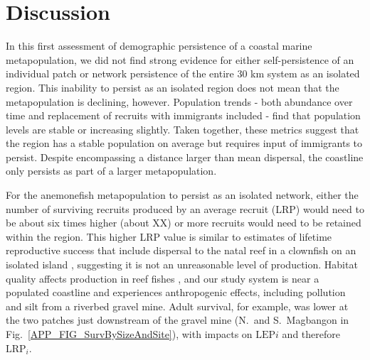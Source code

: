 \documentclass[12pt, oneside]{article}   	%
\begin{document}
\section*{Discussion}

In this first assessment of demographic persistence of a coastal marine metapopulation, we did not find strong evidence for either self-persistence of an individual patch or network persistence of the entire 30 km system as an isolated region. This inability to persist as an isolated region does not mean that the metapopulation is declining, however. Population trends - both abundance over time and replacement of recruits with immigrants included - find that population levels are stable or increasing slightly. Taken together, these metrics suggest that the region has a stable population on average but requires input of immigrants to persist. Despite encompassing a distance larger than mean dispersal, the coastline only persists as part of a larger metapopulation.

For the anemonefish metapopulation to persist as an isolated network, either the number of surviving recruits produced by an average recruit (LRP) would need to be about six times higher (about XX) or more recruits would need to be retained within the region. This higher LRP value is similar to estimates of lifetime reproductive success that include dispersal to the natal reef in a clownfish on an isolated island \citep{salles2020strong}, suggesting it is not an unreasonable level of production. Habitat quality affects production in reef fishes \citep[e.g.,][]{salles2020strong, hayashi2019low}, and our study system is near a populated coastline and experiences anthropogenic effects, including pollution and silt from a riverbed gravel mine. Adult survival, for example, was lower at the two patches just downstream of the gravel mine (N.\ and S.\ Magbangon in Fig.\ \ref{APP_FIG_SurvBySizeAndSite}), with impacts on $\text{LEP}i$ and therefore $\text{LRP}_i$. 
\end{document}
